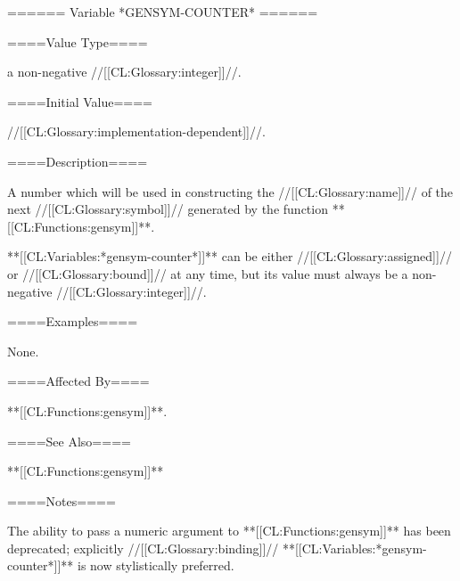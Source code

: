 ====== Variable *GENSYM-COUNTER* ======

====Value Type====

a non-negative //[[CL:Glossary:integer]]//.

====Initial Value====

//[[CL:Glossary:implementation-dependent]]//.

====Description====

A number which will be used in constructing the //[[CL:Glossary:name]]// of the next //[[CL:Glossary:symbol]]// generated by the function **[[CL:Functions:gensym]]**.

**[[CL:Variables:*gensym-counter*]]** can be either //[[CL:Glossary:assigned]]// or //[[CL:Glossary:bound]]// at any time, but its value must always be a non-negative //[[CL:Glossary:integer]]//.

====Examples====

None.

====Affected By====

**[[CL:Functions:gensym]]**.

====See Also====

**[[CL:Functions:gensym]]**

====Notes====

The ability to pass a numeric argument to **[[CL:Functions:gensym]]** has been deprecated; explicitly //[[CL:Glossary:binding]]// **[[CL:Variables:*gensym-counter*]]** is now stylistically preferred.

